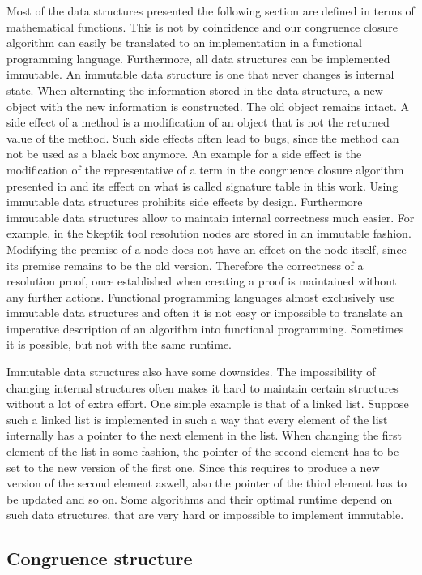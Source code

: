 Most of the data structures presented the following section are defined in terms of mathematical functions.
This is not by coincidence and our congruence closure algorithm can easily be translated to an implementation in a functional programming language.
Furthermore, all data structures can be implemented immutable.
An immutable data structure is one that never changes is internal state.
When alternating the information stored in the data structure, a new object with the new information is constructed.
The old object remains intact.
A side effect of a method is a modification of an object that is not the returned value of the method.
Such side effects often lead to bugs, since the method can not be used as a black box anymore.
An example for a side effect is the modification of the representative of a term in the congruence closure algorithm presented in \cite{Fontaine2004} and its effect on what is called signature table in this work.
Using immutable data structures prohibits side effects by design.
Furthermore immutable data structures allow to maintain internal correctness much easier.
For example, in the Skeptik tool resolution nodes are stored in an immutable fashion.
Modifying the premise of a node does not have an effect on the node itself, since its premise remains to be the old version.
Therefore the correctness of a resolution proof, once established when creating a proof is maintained without any further actions.
Functional programming languages almost exclusively use immutable data structures and often it is not easy or impossible to translate an imperative description of an algorithm into functional programming.
Sometimes it is possible, but not with the same runtime.

Immutable data structures also have some downsides.
The impossibility of changing internal structures often makes it hard to maintain certain structures without a lot of extra effort.
One simple example is that of a linked list.
Suppose such a linked list is implemented in such a way that every element of the list internally has a pointer to the next element in the list.
When changing the first element of the list in some fashion, the pointer of the second element has to be set to the new version of the first one.
Since this requires to produce a new version of the second element aswell, also the pointer of the third element has to be updated and so on.
Some algorithms and their optimal runtime depend on such data structures, that are very hard or impossible to implement immutable.

\subsection*{Congruence structure}

